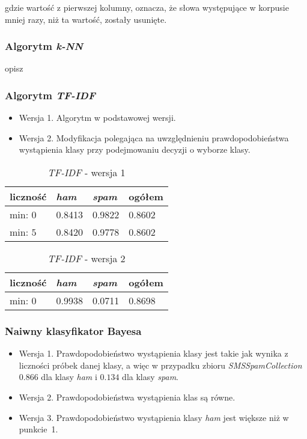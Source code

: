 \documentclass[a4paper,12pt]{article}
\begin{document}
gdzie wartość z pierwszej kolumny, oznacza, że słowa występujące w korpusie mniej razy, niż ta wartość, zostały usunięte.

\subsubsection{Algorytm \textit{k-NN}}

opisz

\subsubsection{Algorytm \textit{TF-IDF}}

\begin{itemize}
\item Wersja 1. Algorytm w podstawowej wersji.
\item Wersja 2. Modyfikacja polegająca na uwzględnieniu prawdopodobieństwa wystąpienia klasy przy
	podejmowaniu decyzji o wyborze klasy.
\end{itemize}

\begin{table}[h!]
\centering
\begin{tabular}{|l||p{2.5cm}|p{2.5cm}||p{2.5cm}|}
\hline
liczność & \textit{ham} & \textit{spam} & ogółem \\ \hline
min: $0$ & 0.8413 & 0.9822 & 0.8602 \\ \hline
min: $5$ & 0.8420 & 0.9778 & 0.8602 \\ \hline
\end{tabular}
\caption{\textit{TF-IDF} - wersja 1}
\end{table}

\begin{table}[h!]
\centering
\begin{tabular}{|l||p{2.5cm}|p{2.5cm}||p{2.5cm}|}
\hline
liczność & \textit{ham} & \textit{spam} & ogółem \\ \hline
min: $0$ & 0.9938 & 0.0711 & 0.8698 \\ \hline
\end{tabular}
\caption{\textit{TF-IDF} - wersja 2}
\end{table}

\subsubsection{Naiwny klasyfikator Bayesa}

\begin{itemize}
\item Wersja 1. Prawdopodobieństwo wystąpienia klasy jest takie jak wynika z liczności próbek danej klasy, a więc w przypadku zbioru 
	\textit{SMSSpamCollection} $0.866$ dla klasy \textit{ham} i $0.134$ dla klasy \textit{spam}.
\item Wersja 2. Prawdopodobieństwa wystąpienia klas są równe.
\item Wersja 3. Prawdopodobieństwo wystąpienia klasy \textit{ham} jest większe niż w punkcie~1.
\end{itemize}
\end{document}

